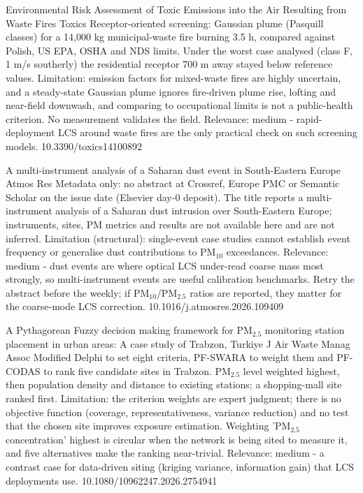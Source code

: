 \documentclass[10pt]{article}
\begin{document}
{Environmental Risk Assessment of Toxic Emissions into the Air Resulting from Waste Fires}
{Toxics}
{Receptor-oriented screening: Gaussian plume (Pasquill classes) for a 14,000 kg municipal-waste fire burning 3.5 h, compared against Polish, US EPA, OSHA and NDS limits. Under the worst case analysed (class F, 1 m/s southerly) the residential receptor 700 m away stayed below reference values. Limitation: emission factors for mixed-waste fires are highly uncertain, and a steady-state Gaussian plume ignores fire-driven plume rise, lofting and near-field downwash, and comparing to occupational limits is not a public-health criterion. No measurement validates the field. Relevance: medium - rapid-deployment LCS around waste fires are the only practical check on such screening models.}
{10.3390/toxics14100892}

{A multi-instrument analysis of a Saharan dust event in South-Eastern Europe}
{Atmos Res}
{Metadata only: no abstract at Crossref, Europe PMC or Semantic Scholar on the issue date (Elsevier day-0 deposit). The title reports a multi-instrument analysis of a Saharan dust intrusion over South-Eastern Europe; instruments, sites, PM metrics and results are not available here and are not inferred. Limitation (structural): single-event case studies cannot establish event frequency or generalise dust contributions to PM$_{10}$ exceedances. Relevance: medium - dust events are where optical LCS under-read coarse mass most strongly, so multi-instrument events are useful calibration benchmarks. Retry the abstract before the weekly; if PM$_{10}$/PM$_{2.5}$ ratios are reported, they matter for the coarse-mode LCS correction.}
{10.1016/j.atmosres.2026.109409}

\par{}\baselineskip{}\baselineskip
{}

{A Pythagorean Fuzzy decision making framework for PM$_{2.5}$ monitoring station placement in urban areas: A case study of Trabzon, Turkiye}
{J Air Waste Manag Assoc}
{Modified Delphi to set eight criteria, PF-SWARA to weight them and PF-CODAS to rank five candidate sites in Trabzon. PM$_{2.5}$ level weighted highest, then population density and distance to existing stations; a shopping-mall site ranked first. Limitation: the criterion weights are expert judgment; there is no objective function (coverage, representativeness, variance reduction) and no test that the chosen site improves exposure estimation. Weighting 'PM$_{2.5}$ concentration' highest is circular when the network is being sited to measure it, and five alternatives make the ranking near-trivial. Relevance: medium - a contrast case for data-driven siting (kriging variance, information gain) that LCS deployments use.}
{10.1080/10962247.2026.2754941}
\end{document}
